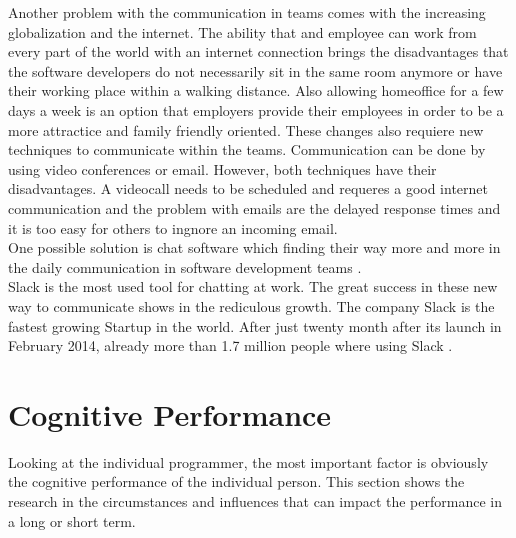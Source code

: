 \bigbreak
Another problem with the communication in teams comes with the increasing globalization and the internet. The ability that and employee can work from every part of the world with an internet connection brings the disadvantages that the software developers do not necessarily sit in the same room anymore or have their working place within a walking distance. 
Also allowing homeoffice for a few days a week is an option that employers provide their employees in order to be a more attractice and family friendly oriented. These changes also requiere new techniques to communicate within the teams. Communication can be done by using video conferences or email. However, both techniques have their disadvantages. A videocall needs to be scheduled and requeres a good internet communication and the problem with emails are the delayed response times and it is too easy for others to ingnore an incoming email\cite{carmel1999global}.\\
One possible solution is chat software which finding their way more and more in the daily communication in software development teams \cite{jarvenpaa1998communication}.\\ 
Slack is the most used tool for chatting at work. The great success in these new way to communicate shows in the rediculous growth. The company Slack is the fastest growing Startup in the world. After just twenty month after its launch in February 2014, already more than 1.7 million people where using Slack  \cite{bercovici2015}.

\section{Cognitive Performance}
Looking at the individual programmer, the most important factor is obviously the cognitive performance of the individual person. This section shows the research in the circumstances and influences that can impact the performance in a long or short term. 

